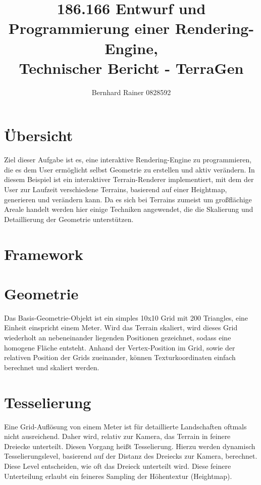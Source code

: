\documentclass[a4paper,10pt]{article}
\begin{document}
\author{Bernhard Rainer 0828592 \\
	}

\title{186.166 Entwurf und Programmierung einer Rendering-Engine,\\
	Technischer Bericht - TerraGen}

\maketitle

\section*{Übersicht}
Ziel dieser Aufgabe ist es, eine interaktive Rendering-Engine zu programmieren, die es dem User ermöglicht selbst Geometrie zu erstellen und aktiv verändern. In diesem Beispiel ist ein interaktiver Terrain-Renderer implementiert, mit dem der User zur Laufzeit verschiedene Terrains, basierend auf einer Heightmap, generieren und verändern kann. 
Da es sich bei Terrains zumeist um großflächige Areale handelt werden hier einige Techniken angewendet, die die Skalierung und Detaillierung der Geometrie unterstützen. 

\section*{Framework}

\section*{Geometrie}
Das Basis-Geometrie-Objekt ist ein simples 10x10 Grid mit 200 Triangles, eine Einheit einspricht einem Meter. Wird das Terrain skaliert, wird dieses Grid wiederholt an nebeneinander liegenden Positionen gezeichnet, sodass eine homogene Fläche entsteht. Anhand der Vertex-Position im Grid, sowie der relativen Position der Grids zueinander, können Texturkoordinaten einfach berechnet und skaliert werden. 

\section*{Tesselierung}
Eine Grid-Auflösung von einem Meter ist für detaillierte Landschaften oftmals nicht ausreichend. Daher wird, relativ zur Kamera, das Terrain in feinere Dreiecke unterteilt. Diesen Vorgang heißt Tesselierung. Hierzu werden dynamisch  Tesselierungslevel, basierend auf der Distanz des Dreiecks zur Kamera, berechnet. Diese Level entscheiden, wie oft das Dreieck unterteilt wird. Diese feinere Unterteilung erlaubt ein feineres Sampling der Höhentextur (Heightmap). 
\end{document}
